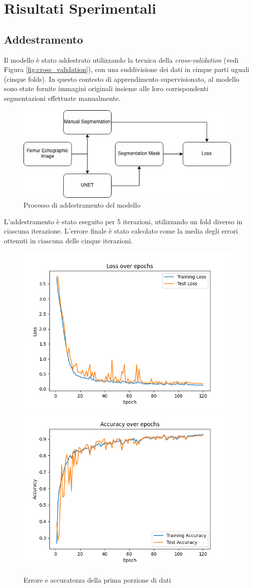 \chapter{Risultati Sperimentali}
\label{chap:Risultati sperimentali}

\section{Addestramento}
\label{sec:Addestramento}

Il modello è stato addestrato utilizzando la tecnica della \textit{cross-validation} (vedi Figura
\ref{fig:cross_validation}), con una suddivisione dei dati in cinque parti uguali (cinque folds). In
questo contesto di apprendimento supervisionato, al modello sono state fornite immagini originali
insieme alle loro corrispondenti segmentazioni effettuate manualmente.

\begin{figure}[!ht]
	\centering
	\includegraphics[width=0.7\columnwidth]{Immagini/training.png}
	\caption{Processo di addestramento del modello}
	\label{fig:addestramento_del_modello}
\end{figure}

L'addestramento è stato eseguito per 5 iterazioni, utilizzando un fold diverso in ciascuna
iterazione. L'errore finale è stato calcolato come la media degli errori ottenuti in ciascuna delle
cinque iterazioni.


\begin{figure}[!ht]
	\centering
	\includegraphics[width=0.4\columnwidth]{Immagini/fold_0_loss.png} \includegraphics[width=0.4\columnwidth]{Immagini/fold_0_accuracy.png}
	\caption{Errore e accuratezza della prima porzione di dati}
	\label{fig:loss e accuratezza della prima porzione di dati}
\end{figure}

